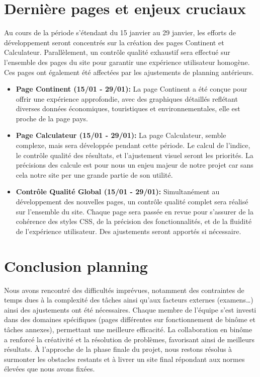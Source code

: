 \documentclass[mstat,12pt]{unswthesis}
\begin{document}
\begin{adjustwidth}{-2cm}{}
\newpage

\hypertarget{derniuxe8re-pages-et-enjeux-cruciaux}{%
\section{Dernière pages et enjeux
cruciaux}\label{derniuxe8re-pages-et-enjeux-cruciaux}}

Au cours de la période s'étendant du 15 janvier au 29 janvier, les
efforts de développement seront concentrés sur la création des pages
Continent et Calculateur. Parallèlement, un contrôle qualité exhaustif
sera effectué sur l'ensemble des pages du site pour garantir une
expérience utilisateur homogène. Ces pages ont également été affectées
par les ajustements de planning antérieurs.

\begin{itemize}
\tightlist
\item
  \textbf{Page Continent (15/01 - 29/01):} La page Continent a été
  conçue pour offrir une expérience approfondie, avec des graphiques
  détaillés reflétant diverses données économiques, touristiques et
  environnementales, elle est proche de la page pays.
\item
  \textbf{Page Calculateur (15/01 - 29/01):} La page Calculateur, semble
  complexe, mais sera développée pendant cette période. Le calcul de
  l'indice, le contrôle qualité des résultats, et l'ajustement visuel
  seront les priorités. La précisions des calcule est pour nous un enjeu
  majeur de notre projet car sans cela notre site per une grande partie
  de son utilité.
\item
  \textbf{Contrôle Qualité Global (15/01 - 29/01):} Simultanément au
  développement des nouvelles pages, un contrôle qualité complet sera
  réalisé sur l'ensemble du site. Chaque page sera passée en revue pour
  s'assurer de la cohérence des styles CSS, de la précision des
  fonctionnalités, et de la fluidité de l'expérience utilisateur. Des
  ajustements seront apportés si nécessaire.
\end{itemize}

\hypertarget{conclusion-planning}{%
\section{Conclusion planning}\label{conclusion-planning}}

Nous avons rencontré des difficultés imprévues, notamment des
contraintes de temps dues à la complexité des tâches ainsi qu'aux
facteurs externes (examens\ldots) ainsi des ajustements ont été
nécessaires. Chaque membre de l'équipe s'est investi dans des domaines
spécifiques (pages différentes sur fonctionnement de binôme et tâches
annexes), permettant une meilleure efficacité. La collaboration en
binôme a renforcé la créativité et la résolution de problèmes,
favorisant ainsi de meilleurs résultats. À l'approche de la phase finale
du projet, nous restons résolus à surmonter les obstacles restants et à
livrer un site final répondant aux normes élevées que nous avons fixées.


\end{adjustwidth}
\end{document}
